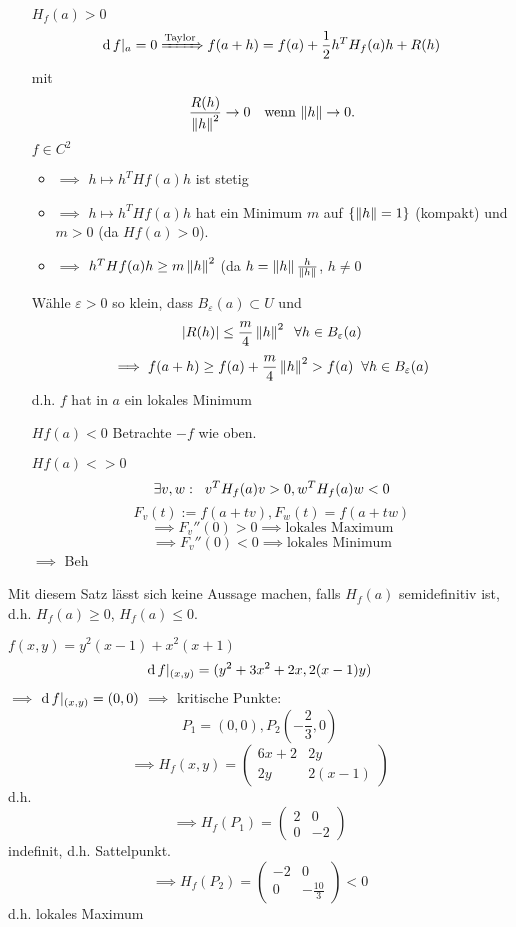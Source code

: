 \begin{Bew}$\,$

  \begin{itemize}
    \item[$H_f(a)>0$]
      \[\operatorname{d} f|_a=0\xRightarrow{\text{Taylor}}f(a+h)=f(a)+\frac{1}{2}h^TH_f(a)h+R(h)\\\]
      mit
      \[\frac{R(h)}{\left\| h \right\|^2}\rightarrow 0 \quad \mbox{wenn $\|h\|\rightarrow 0$}.\]
      $f\in C^2$
      \begin{itemize}
        \item $\implies$ $h\mapsto h^TH f(a)h$ ist stetig
        \item $\implies$  $h\mapsto h^TH f(a)h$ hat ein Minimum $m$ auf $\left\{ \left\| h \right\|=1 \right\}$ (kompakt)
 und $m > 0$ (da $H f(a)>0$).
        \item $\implies$ $h^TH f (a) h\geq m\left\| h \right\|^2$ (da $h=\left\| h \right\|\frac{h}{\left\| h \right\|}$, $h\neq 0$
      \end{itemize}
      Wähle $\varepsilon>0$ so klein, dass $B_\varepsilon(a)\subset U$ und
      \[\left| R(h) \right|\leq \frac{m}{4}\left\| h \right\|^2\hspace{2mm}\forall h\in B_\varepsilon(a)\]
      \[\implies f(a+h)\geq f(a)+\frac{m}{4}\left\| h \right\|^2>f(a)\hspace{2mm}\forall h\in B_\varepsilon(a)\]
      d.h. $f$ hat in $a$ ein lokales Minimum
    \item[$H f(a)<0$]
       Betrachte $-f$ wie oben.
    \item[$H f(a)<>0$] %
      \[\exists v,w :\hspace{2mm} v^T H_f(a) v>0, w^T H_f(a) w<0\]
      \[F_v(t):=f(a+tv), F_w(t)=f(a+tw)\]
      \[\implies F_v''(0)>0 \implies \text{lokales Maximum}\]
      \[\implies F_v''(0)<0 \implies \text{lokales Minimum}\]
      $\implies$ Beh
  \end{itemize}
\end{Bew}
\begin{Bem}
  Mit diesem Satz lässt sich keine Aussage machen, falls $H_f(a)$ semidefinitiv ist, d.h. $H_f(a)\geq 0$, $H_f(a)\leq 0$.
\end{Bem}
\begin{Bsp}
  $f(x,y)=y^2(x-1)+x^2(x+1)$
  \[\operatorname{d} f|_{(x,y)} = (y^2+3x^2+2x, 2(x-1)y)\]
  $\implies$ $\operatorname{d} f|_{(x,y)}=(0,0)$ $\implies$ kritische Punkte:
  \[P_1=(0,0), P_2(-\frac{2}{3}, 0)\]
  \[\implies H_f(x,y)= \begin{pmatrix}
    6x+2&2y\\
    2y&2(x-1)
  \end{pmatrix}\]
  d.h.
  \[\implies H_f(P_1)= \begin{pmatrix}
    2&0\\
    0&-2
  \end{pmatrix}\]
  indefinit, d.h. Sattelpunkt.
  \[\implies H_f(P_2)= \begin{pmatrix}
    -2&0\\
    0&-\frac{10}{3}
  \end{pmatrix}<0\]
  d.h. lokales Maximum
\end{Bsp}
